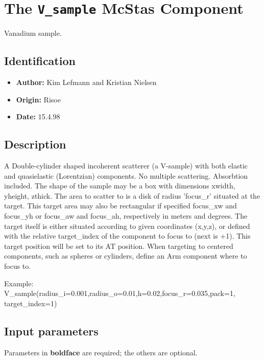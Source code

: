 \section{The \texttt{V\_sample} McStas Component}
Vanadium sample.

\subsection*{Identification}
\begin{itemize}
  \item \textbf{Author:} Kim Lefmann and Kristian Nielsen
  \item \textbf{Origin:} Risoe
  \item \textbf{Date:} 15.4.98
\end{itemize}

\subsection*{Description}
A Double-cylinder shaped incoherent scatterer (a V-sample) with both elastic and quasielastic (Lorentzian) components. No multiple scattering. Absorbtion included. The shape of the sample may be a box with dimensions xwidth, yheight, zthick. The area to scatter to is a disk of radius 'focus\_r' situated at the target. This target area may also be rectangular if specified focus\_xw and focus\_yh or focus\_aw and focus\_ah, respectively in meters and degrees. The target itself is either situated according to given coordinates (x,y,z), or defined with the relative target\_index of the component to focus to (next is +1). This target position will be set to its AT position. When targeting to centered components, such as spheres or cylinders, define an Arm component where to focus to.

Example: V\_sample(radius\_i=0.001,radius\_o=0.01,h=0.02,focus\_r=0.035,pack=1, target\_index=1)

\subsection*{Input parameters}
Parameters in \textbf{boldface} are required; the others are optional.

